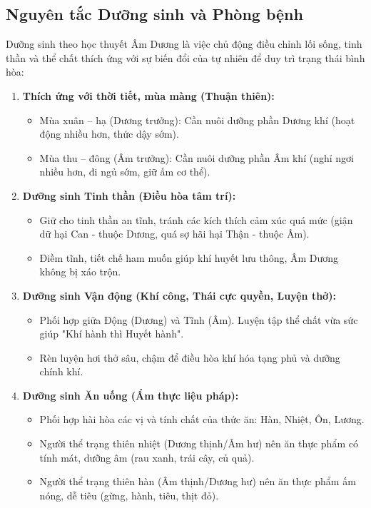 \subsection{Nguyên tắc Dưỡng sinh và Phòng bệnh}

Dưỡng sinh theo học thuyết Âm Dương là việc chủ động điều chỉnh lối sống, tinh thần và thể chất thích ứng với sự biến đổi của tự nhiên để duy trì trạng thái bình hòa:

\begin{enumerate}
    \item \textbf{Thích ứng với thời tiết, mùa màng (Thuận thiên):}
    \begin{itemize}
        \item Mùa xuân -- hạ (Dương trưởng): Cần nuôi dưỡng phần Dương khí (hoạt động nhiều hơn, thức dậy sớm).
        \item Mùa thu -- đông (Âm trưởng): Cần nuôi dưỡng phần Âm khí (nghỉ ngơi nhiều hơn, đi ngủ sớm, giữ ấm cơ thể).
    \end{itemize}

    \item \textbf{Dưỡng sinh Tinh thần (Điều hòa tâm trí):}
    \begin{itemize}
        \item Giữ cho tinh thần an tĩnh, tránh các kích thích cảm xúc quá mức (giận dữ hại Can - thuộc Dương, quá sợ hãi hại Thận - thuộc Âm).
        \item Điềm tĩnh, tiết chế ham muốn giúp khí huyết lưu thông, Âm Dương không bị xáo trộn.
    \end{itemize}

    \item \textbf{Dưỡng sinh Vận động (Khí công, Thái cực quyền, Luyện thở):}
    \begin{itemize}
        \item Phối hợp giữa Động (Dương) và Tĩnh (Âm). Luyện tập thể chất vừa sức giúp "Khí hành thì Huyết hành".
        \item Rèn luyện hơi thở sâu, chậm để điều hòa khí hóa tạng phủ và dưỡng chính khí.
    \end{itemize}

    \item \textbf{Dưỡng sinh Ăn uống (Ẩm thực liệu pháp):}
    \begin{itemize}
        \item Phối hợp hài hòa các vị và tính chất của thức ăn: Hàn, Nhiệt, Ôn, Lương.
        \item Người thể trạng thiên nhiệt (Dương thịnh/Âm hư) nên ăn thực phẩm có tính mát, dưỡng âm (rau xanh, trái cây, củ quả).
        \item Người thể trạng thiên hàn (Âm thịnh/Dương hư) nên ăn thực phẩm ấm nóng, dễ tiêu (gừng, hành, tiêu, thịt đỏ).
    \end{itemize}
\end{enumerate}

